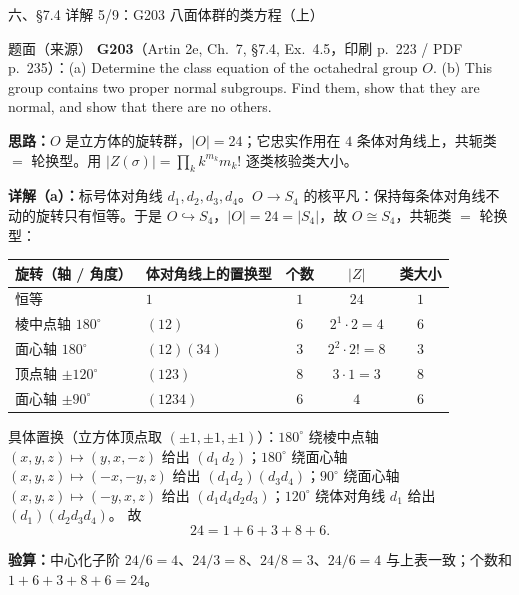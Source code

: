 \documentclass[aspectratio=169,10pt,fontset=none]{ctexbeamer}
\newcommand{\ex}[1]{\textcolor{accent}{\footnotesize\bfseries #1}}
\newcommand{\key}[1]{\textcolor{ink}{\bfseries #1}}
\begin{document}
\begin{frame}[t]{六、\S7.4 详解 5/9：G203 八面体群的类方程（上）}
\label{ex:G203}
\scriptsize
\begin{block}{\footnotesize 题面（来源）}
\ex{G203}（Artin 2e, Ch.~7, \S7.4, Ex.~4.5，印刷 p.~223 / PDF p.~235）：(a) Determine the class equation of the octahedral group $O$. (b) This group contains two proper normal subgroups. Find them, show that they are normal, and show that there are no others.
\end{block}
\key{思路：}$O$ 是立方体的旋转群，$|O|=24$；它忠实作用在 $4$ 条体对角线上，共轭类 $=$ 轮换型。用 $|Z(\sigma)|=\prod_k k^{m_k}m_k!$ 逐类核验类大小。

\key{详解（a）：}标号体对角线 $d_1,d_2,d_3,d_4$。$O\to S_4$ 的核平凡：保持每条体对角线不动的旋转只有恒等。于是 $O\hookrightarrow S_4$，$|O|=24=|S_4|$，故 $O\cong S_4$，共轭类 $=$ 轮换型：
\begin{center}
\renewcommand{\arraystretch}{1.08}
\begin{tabular}{@{}l l c c c@{}}
\toprule
旋转（轴 / 角度） & 体对角线上的置换型 & 个数 & $|Z|$ & 类大小\\
\midrule
恒等 & $1$ & $1$ & $24$ & $1$\\
棱中点轴 $180^\circ$ & $(12)$ & $6$ & $2^1\cdot2=4$ & $6$\\
面心轴 $180^\circ$ & $(12)(34)$ & $3$ & $2^2\cdot2!=8$ & $3$\\
顶点轴 $\pm120^\circ$ & $(123)$ & $8$ & $3\cdot1=3$ & $8$\\
面心轴 $\pm90^\circ$ & $(1234)$ & $6$ & $4$ & $6$\\
\bottomrule
\end{tabular}
\end{center}
具体置换（立方体顶点取 $(\pm1,\pm1,\pm1)$）：$180^\circ$ 绕棱中点轴 $(x,y,z)\mapsto(y,x,-z)$ 给出 $(d_1\,d_2)$；$180^\circ$ 绕面心轴 $(x,y,z)\mapsto(-x,-y,z)$ 给出 $(d_1d_2)(d_3d_4)$；$90^\circ$ 绕面心轴 $(x,y,z)\mapsto(-y,x,z)$ 给出 $(d_1d_4d_2d_3)$；$120^\circ$ 绕体对角线 $d_1$ 给出 $(d_1)(d_2d_3d_4)$。
故 \[24=1+6+3+8+6.\]

\key{验算：}中心化子阶 $24/6=4$、$24/3=8$、$24/8=3$、$24/6=4$ 与上表一致；个数和 $1+6+3+8+6=24$。
\end{frame}
\end{document}
